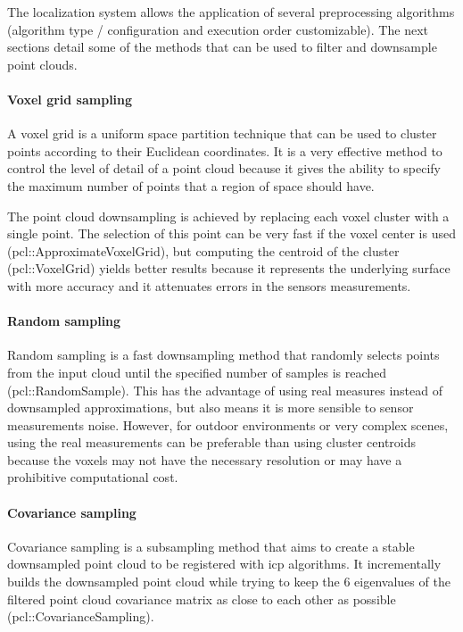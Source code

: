 The localization system allows the application of several preprocessing algorithms (algorithm type / configuration and execution order customizable). The next sections detail some of the methods that can be used to filter and downsample point clouds.


\paragraph{Voxel grid sampling}

A voxel grid is a uniform space partition technique that can be used to cluster points according to their Euclidean coordinates. It is a very effective method to control the level of detail of a point cloud because it gives the ability to specify the maximum number of points that a region of space should have.

The point cloud downsampling is achieved by replacing each voxel cluster with a single point. The selection of this point can be very fast if the voxel center is used (pcl::ApproximateVoxelGrid), but computing the centroid of the cluster (pcl::VoxelGrid) yields better results because it represents the underlying surface with more accuracy and it attenuates errors in the sensors measurements.


\paragraph{Random sampling}

Random sampling \cite{Vitter1984} is a fast downsampling method that randomly selects points from the input cloud until the specified number of samples is reached (pcl::RandomSample). This has the advantage of using real measures instead of downsampled approximations, but also means it is more sensible to sensor measurements noise. However, for outdoor environments or very complex scenes, using the real measurements can be preferable than using cluster centroids because the voxels may not have the necessary resolution or may have a prohibitive computational cost.


\paragraph{Covariance sampling}

Covariance sampling \cite{Gelfand} is a subsampling method that aims to create a stable downsampled point cloud to be registered with \gls{icp} algorithms. It incrementally builds the downsampled point cloud while trying to keep the 6 eigenvalues of the filtered point cloud covariance matrix as close to each other as possible (pcl::CovarianceSampling).

